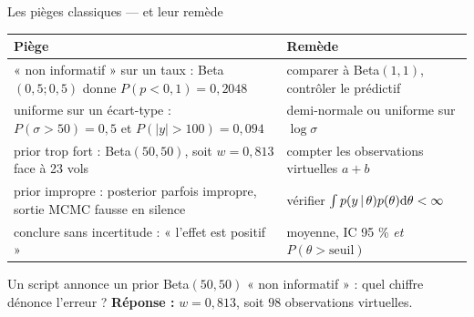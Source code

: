 \begin{frame}{Les pièges classiques — et leur remède}
\centering
\renewcommand{\arraystretch}{1.15}
\small
\begin{tabular}{@{}p{7.4cm}p{4.6cm}@{}}
\toprule
\textbf{Piège} & \textbf{Remède} \\
\midrule
« non informatif » sur un taux : Beta$(0{,}5;0{,}5)$ donne
$P(p<0{,}1) = 0{,}2048$ & comparer à Beta$(1,1)$, contrôler le prédictif \\[1mm]
uniforme sur un écart-type : $P(\sigma > 50) = 0{,}5$ et
$P(|y| > 100) = 0{,}094$ & demi-normale ou uniforme sur $\log\sigma$ \\[1mm]
prior trop fort : Beta$(50,50)$, soit $w = 0{,}813$ face à 23 vols &
compter les observations virtuelles $a+b$ \\[1mm]
prior impropre : posterior parfois impropre, sortie MCMC fausse en silence &
vérifier $\int p(y \,\vert\, \theta)p(\theta)\mathrm{d}\theta < \infty$ \\[1mm]
conclure sans incertitude : « l'effet est positif » & moyenne, IC 95 \%
\emph{et} $P(\theta > \text{seuil})$ \\[1mm]
\bottomrule
\end{tabular}
\vspace{-1mm}
\begin{qbox}
Un script annonce un prior Beta$(50,50)$ « non informatif » : quel chiffre
dénonce l'erreur ? \quad \textcolor{byBlue}{\textbf{Réponse :}} $w = 0{,}813$, soit
$98$ observations virtuelles.
\end{qbox}
\end{frame}

